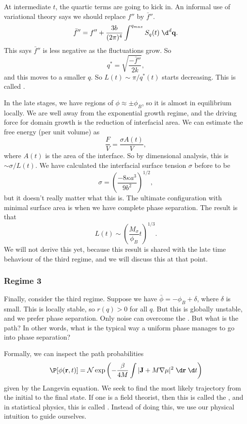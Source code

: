 \documentclass[a4paper]{article}
\begin{document}
At intermediate $t$, the quartic terms are going to kick in. An informal use of variational theory says we should replace $f''$ by $\bar{f}''$.
\[
  \bar{f}'' = f'' + \frac{3b}{(2\pi)^4} \int^{q_{max}} S_q(t) \;\d^d \mathbf{q}.
\]
This says $\bar{f}''$ is less negative as the fluctuations grow. So
\[
  q^* = \sqrt{\frac{-\bar{f}''}{2k}},
\]
and this moves to a smaller $q$. So $L(t) \sim \pi/q^*(t)$ starts decreasing. This is called .

In the late stages, we have regions of $\phi \approx \pm \phi_B$, so it is almost in equilibrium locally. We are well away from the exponential growth regime, and the driving force for domain growth is the reduction of interfacial area. We can estimate the free energy (per unit volume) as
\[
  \frac{F}{V} = \frac{\sigma A(t)}{V},
\]
where $A(t)$ is the area of the interface. So by dimensional analysis, this is $\sim \sigma/L(t)$. We have calculated the interfacial surface tension $\sigma$ before to be
\[
  \sigma = \left(\frac{-8\kappa a^3}{9b^2}\right)^{1/2},
\]
but it doesn't really matter what this is. The ultimate configuration with minimal surface area is when we have complete phase separation. The result is that
\[
  L(t) \sim \left(\frac{M_\sigma}{\phi_B} t\right)^{1/3}.
\]
We will not derive this yet, because this result is shared with the late time behaviour of the third regime, and we will discuss this at that point.

\subsubsection*{Regime 3}
Finally, consider the third regime. Suppose we have $\bar{\phi} = -\phi_B + \delta$, where $\delta$ is small. This is locally stable, so $r(q) > 0$ for all $q$. But this is globally unstable, and we prefer phase separation. Only noise can overcome the . But what is the path? In other words, what is the typical way a uniform phase manages to go into phase separation?

Formally, we can inspect the path probabilities
\[
  \P[\phi(\mathbf{r}, t)] = \mathcal{N} \exp \left(-\frac{\beta}{4M} \int |\mathbf{J} + M \nabla \mu|^2 \;\d \mathbf{r} \;\d t\right)
\]
given by the Langevin equation. We seek to find the most likely trajectory from the initial to the final state. If one is a field theorist, then this is called the , and in statistical physics, this is called . Instead of doing this, we use our physical intuition to guide ourselves.
\end{document}
